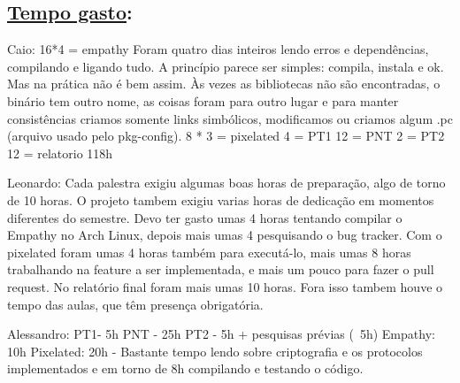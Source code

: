 \subsection*{\underline{Tempo gasto}:}

Caio:
16*4 = empathy
Foram quatro dias  inteiros lendo erros e dependências, compilando e ligando tudo. A princípio parece ser simples: compila, instala e ok. Mas na prática não é bem assim. Às vezes as bibliotecas não são encontradas, o binário tem outro nome, as coisas foram para outro lugar e para manter consistências criamos somente links simbólicos, modificamos ou criamos algum .pc (arquivo usado pelo pkg-config).
8 * 3 = pixelated
4       = PT1
12     = PNT
2       = PT2
12     = relatorio
118h

Leonardo:
Cada palestra exigiu algumas boas horas de preparação, algo de torno de 10 horas. O projeto tambem exigiu varias horas de dedicação em momentos diferentes do semestre. Devo ter gasto umas 4 horas tentando compilar o Empathy no Arch Linux, depois mais umas 4 pesquisando o bug tracker. Com o pixelated foram umas 4 horas também para executá-lo, mais umas 8 horas trabalhando na feature a ser implementada, e mais um pouco para fazer o pull request. No relatório final foram mais umas 10 horas.
Fora isso tambem houve o tempo das aulas, que têm presença obrigatória.

Alessandro:
PT1- 5h
PNT - 25h
PT2 - 5h + pesquisas prévias (~5h)
Empathy: 10h
Pixelated: 20h - Bastante tempo lendo sobre criptografia e os protocolos implementados e em torno de 8h compilando e testando o código.
